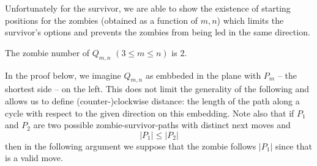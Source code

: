 Unfortunately for the survivor, we are able to show
the existence of starting positions for the zombies (obtained as a function of $m, n$) which
limits the survivor's options and prevents the zombies from being led in the same direction.

\begin{theorem}
 The zombie number of $Q_{m,n}$  $(3 \leq m \leq n)$ is 2.
\end{theorem}

In the proof below, we imagine $Q_{m,n}$ as embbeded in the plane with $P_m$
-- the shortest side -- on the left.
This does not limit the generality of the following and allows us to define
(counter-)clockwise distance: the length of the path
along a cycle with respect to the given direction on this embedding.
Note also that if $P_1$ and $P_2$ are two possible zombie-survivor-paths with distinct next moves and
\[ |P_1| \leq |P_2| \]
then in the following argument we suppose that the zombie follows $|P_1|$
since that is a valid move.

